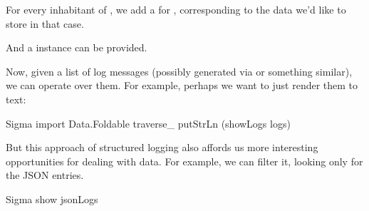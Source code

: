 \documentclass[book.tex]{subfiles}
\begin{document}

For every inhabitant of , we add a  for
, corresponding to the data we'd like to store in that case.


And a  instance can be provided.


Now, given a list of log messages (possibly generated via  or something similar), we can operate over them. For example, perhaps
we want to just render them to text:


\begin{dorepl}{Sigma}
import Data.Foldable
traverse_ putStrLn (showLogs logs)
\end{dorepl}

But this approach of structured logging also affords us more interesting
opportunities for dealing with data. For example, we can filter it, looking only
for the JSON entries.


\begin{dorepl}{Sigma}
show jsonLogs
\end{dorepl}
\end{document}
